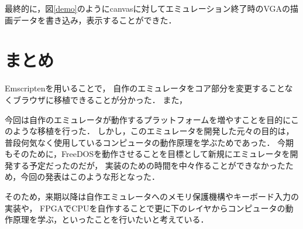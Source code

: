 \documentclass[a4j,10pt]{jsarticle}
\begin{document}
最終的に，図\ref{demo}のようにcanvasに対してエミュレーション終了時のVGAの描画データを書き込み，表示することができた．

\section{まとめ}
Emscriptenを用いることで，
自作のエミュレータをコア部分を変更することなくブラウザに移植できることが分かった．
また，

今回は自作のエミュレータが動作するプラットフォームを増やすことを目的にこのような移植を行った．
しかし，このエミュレータを開発した元々の目的は，
普段何気なく使用しているコンピュータの動作原理を学ぶためであった．
今期もそのために，FreeDOSを動作させることを目標として新規にエミュレータを開発する予定だったのだが，
実装のための時間を中々作ることができなかったため，今回の発表はこのような形となった．

そのため，来期以降は自作エミュレータへのメモリ保護機構やキーボード入力の実装や，
FPGAでCPUを自作することで更に下のレイヤからコンピュータの動作原理を学ぶ，といったことを行いたいと考えている．



\end{document}
